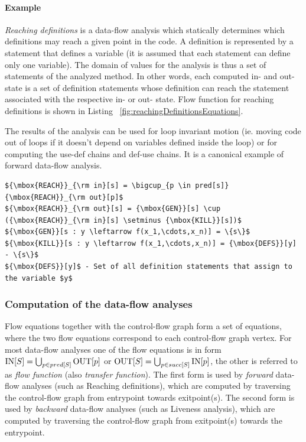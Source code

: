 \paragraph{Example} \emph{Reaching definitions} is a data-flow analysis which statically determines which definitions may reach a given point in the code. A definition is represented by a statement that defines a variable (it is assumed that each statement can define only one variable). The domain of values for the analysis is thus a set of statements of the analyzed method. In other words, each computed in- and out- state is a set of definition statements whose definition can reach the statement associated with the respective in- or out- state. Flow function for reaching definitions is shown in Listing ~\ref{fig:reachingDefinitionsEquations}.

The results of the analysis can be used for loop invariant motion (ie. moving code out of loops if it doesn't depend on variables defined inside the loop) or for computing the use-def chains and def-use chains. It is a canonical example of forward data-flow analysis.

\begin{lstlisting}[mathescape,caption=Flow equations for reaching definitions,label=fig:reachingDefinitionsEquations]
${\mbox{REACH}}_{\rm in}[s] = \bigcup_{p \in pred[s]} {\mbox{REACH}}_{\rm out}[p]$
${\mbox{REACH}}_{\rm out}[s] = {\mbox{GEN}}[s] \cup ({\mbox{REACH}}_{\rm in}[s] \setminus {\mbox{KILL}}[s])$
${\mbox{GEN}}[s : y \leftarrow f(x_1,\cdots,x_n)] = \{s\}$
${\mbox{KILL}}[s : y \leftarrow f(x_1,\cdots,x_n)] = {\mbox{DEFS}}[y] - \{s\}$
${\mbox{DEFS}}[y]$ - Set of all definition statements that assign to the variable $y$
\end{lstlisting}

\subsubsection{Computation of the data-flow analyses}

Flow equations together with the control-flow graph form a set of equations, where the two flow equations correspond to each control-flow graph vertex. For most data-flow analyses one of the flow equations is in form ${\rm IN}[S] = \bigcup_{p \in pred[S]} {\rm OUT}[p]$ or ${\rm OUT}[S] = \bigcup_{p \in succ[S]} {\rm IN}[p]$, the other is referred to as \emph{flow function} (also \emph{transfer function}). The first form is used by \emph{forward} data-flow analyses (such as Reaching definitions), which are computed by traversing the control-flow graph from entrypoint towards exitpoint(s). The second form is used by \emph{backward} data-flow analyses (such as Liveness analysis), which are computed by traversing the control-flow graph from exitpoint(s) towards the entrypoint.

